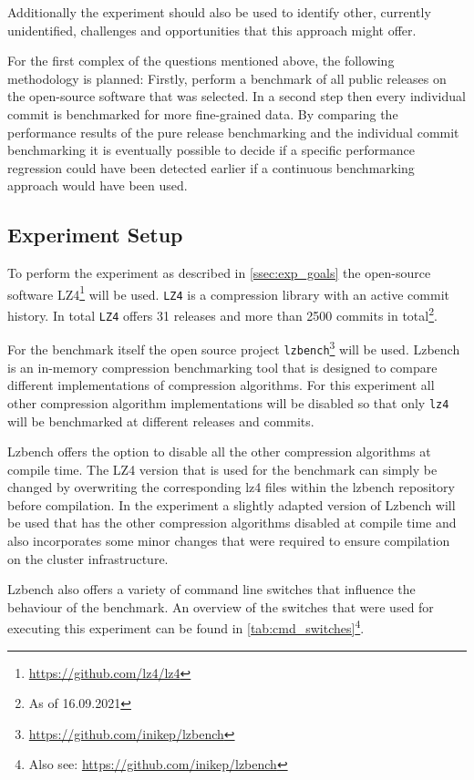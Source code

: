 \documentclass[	runningheads,
				a4paper]{llncs}
\begin{document}
	Additionally the experiment should also be used to identify other, currently unidentified, challenges and opportunities that this approach might offer.

	For the first complex of the questions mentioned above, the following methodology is planned: Firstly, perform a benchmark of all public releases on the open-source software that was selected. In a second step then every individual commit is benchmarked for more fine-grained data. By comparing the performance results of the pure release benchmarking and the individual commit benchmarking it is eventually possible to decide if a specific performance regression could have been detected earlier if a continuous benchmarking approach would have been used.

	\subsection{Experiment Setup}
	\label{ssec:exp_setup}
	
	To perform the experiment as described in \autoref{ssec:exp_goals} the open-source software LZ4\footnote{\url{https://github.com/lz4/lz4}} will be used. \texttt{LZ4} is a compression library with an active commit history. In total \texttt{LZ4} offers 31 releases and more than 2500 commits in total\footnote{As of 16.09.2021}. 
	
	For the benchmark itself the open source project \texttt{lzbench}\footnote{\url{https://github.com/inikep/lzbench}} will be used. Lzbench is an in-memory compression benchmarking tool that is designed to compare different implementations of compression algorithms. For this experiment all other compression algorithm implementations will be disabled so that only \texttt{lz4} will be benchmarked at different releases and commits. 
	
	Lzbench offers the option to disable all the other compression algorithms at compile time. The LZ4 version that is used for the benchmark can simply be changed by overwriting the corresponding lz4 files within the lzbench repository before compilation. In the experiment a slightly adapted version of Lzbench will be used that has the other compression algorithms disabled at compile time and also incorporates some minor changes that were required to ensure compilation on the cluster infrastructure.

	Lzbench also offers a variety of command line switches that influence the behaviour of the benchmark. An overview of the switches that were used for executing this experiment can be found in \autoref{tab:cmd_switches}\footnote{Also see: \url{https://github.com/inikep/lzbench}}.
\end{document}
